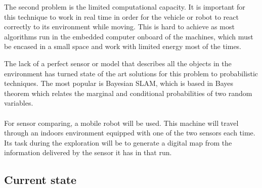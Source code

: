 \documentclass[12pt, letterpaper]{article}
\begin{document}
		 The second problem is the limited computational capacity. It is important for this technique to work in real time in order for the vehicle or robot to react correctly to its environment while moving. This is hard to achieve as most algorithms run in the embedded computer onboard of the machines, which must be encased in a small space and work with limited energy most of the times. 
		 
		 The lack of a perfect sensor or model that describes all the objects in the environment has turned state of the art solutions for this problem to probabilistic techniques. The most popular is Bayesian SLAM, which is based in Bayes theorem which relates the marginal and conditional probabilities of two random variables.
		\\
		\\
		For sensor comparing, a mobile robot will be used. This machine will travel through an indoors environment equipped with one of the two sensors each time. Its task during the exploration will be to generate a digital map from the information delivered by the sensor it has in that run. 
		
		\subsection{Current state}	
			
			
	
	
	
\end{document}
